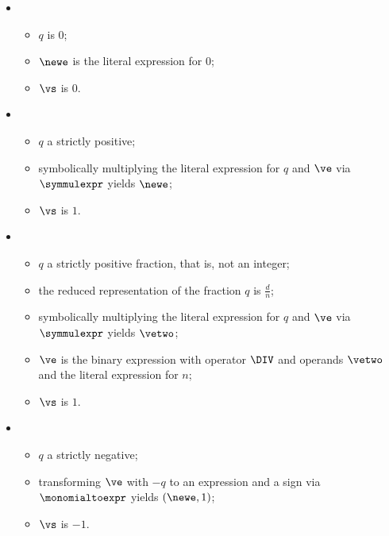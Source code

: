 \ProseParagraph
\OneApplies
\begin{itemize}
  \item {}
  \begin{itemize}
    \item $q$ is $0$;
    \item $\newe$ is the literal expression for $0$;
    \item $\vs$ is $0$.
  \end{itemize}

  \item {}
  \begin{itemize}
    \item $q$ a strictly positive;
    \item symbolically multiplying the literal expression for $q$ and $\ve$ via $\symmulexpr$ yields $\newe$;
    \item $\vs$ is $1$.
  \end{itemize}

  \item {}
  \begin{itemize}
    \item $q$ a strictly positive fraction, that is, not an integer;
    \item the reduced representation of the fraction $q$ is $\frac{d}{n}$;
    \item symbolically multiplying the literal expression for $q$ and $\ve$ via $\symmulexpr$ yields $\vetwo$;
    \item $\ve$ is the binary expression with operator $\DIV$ and operands $\vetwo$ and the literal expression for $n$;
    \item $\vs$ is $1$.
  \end{itemize}

  \item {}
  \begin{itemize}
    \item $q$ a strictly negative;
    \item transforming $\ve$ with $-q$ to an expression and a sign via $\monomialtoexpr$ yields $(\newe, 1)$;
    \item $\vs$ is $-1$.
  \end{itemize}
\end{itemize}

